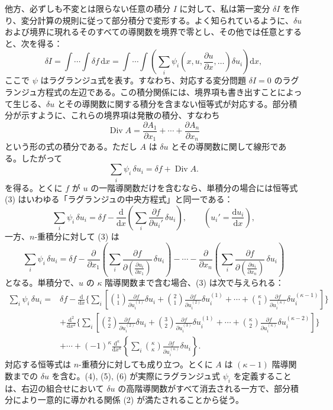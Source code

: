 \documentclass[11pt]{article}
\providecommand{\dd}{\mathrm d}
\providecommand{\Div}{\operatorname{Div}}
\providecommand{\p}{\partial}
\begin{document}
他方、必ずしも不変とは限らない任意の積分 \(I\) に対して、私は第一変分 \(\delta I\) を作り、変分計算の規則に従って部分積分で変形する。よく知られているように、\(\delta u\) および境界に現れるそのすべての導関数を境界で零とし、その他では任意とすると、次を得る：
\begin{equation}
\delta I=\int\!\cdots\!\int \delta f\,\dd x
=\int\!\cdots\!\int\left(\sum_i\psi_i\!\left(x,u,\frac{\p u}{\p x},\ldots\right)\delta u_i\right)\dd x,
\tag{2}
\end{equation}
ここで \(\psi\) はラグランジュ式を表す。すなわち、対応する変分問題 \(\delta I=0\) のラグランジュ方程式の左辺である。この積分関係には、境界項も書き出すことによって生じる、\(\delta u\) とその導関数に関する積分を含まない恒等式が対応する。部分積分が示すように、これらの境界項は発散の積分、すなわち
\[
\Div A=\frac{\p A_1}{\p x_1}+\cdots+\frac{\p A_n}{\p x_n}
\]
という形の式の積分である。ただし \(A\) は \(\delta u\) とその導関数に関して線形である。したがって
\begin{equation}
\sum_i\psi_i\,\delta u_i=\delta f+\Div A.
\tag{3}
\end{equation}
を得る。とくに \(f\) が \(u\) の一階導関数だけを含むなら、単積分の場合には恒等式 (3) はいわゆる「ラグランジュの中央方程式」と同一である：
\begin{equation}
\sum_i \psi_i\,\delta u_i
=\delta f-\frac{\dd}{\dd x}\left(\sum_i\frac{\p f}{\p u_i'}\,\delta u_i\right),
\qquad \left(u_i'=\frac{\dd u_i}{\dd x}\right),
\tag{4}
\end{equation}
一方、\(n\)-重積分に対して (3) は
\begin{equation}
\sum_i\psi_i\,\delta u_i
=
\delta f
-\frac{\p}{\p x_1}\left(\sum_i\frac{\p f}{\p \left(\frac{\p u_i}{\p x_1}\right)}\,\delta u_i\right)
-\cdots
-\frac{\p}{\p x_n}\left(\sum_i\frac{\p f}{\p \left(\frac{\p u_i}{\p x_n}\right)}\,\delta u_i\right)
\tag{5}
\end{equation}
となる。単積分で、\(u\) の \(\kappa\) 階導関数まで含む場合、(3) は次で与えられる：
\begin{equation}
\begin{aligned}
\sum_i\psi_i\,\delta u_i
={}&\delta f
-\frac{\dd}{\dd x}\Bigg\{\sum_i\left[
\binom{1}{1}\frac{\p f}{\p u_i^{(1)}}\delta u_i
+\binom{2}{1}\frac{\p f}{\p u_i^{(2)}}\delta u_i^{(1)}
+\cdots+
\binom{\kappa}{1}\frac{\p f}{\p u_i^{(\kappa)}}\delta u_i^{(\kappa-1)}
\right]\Bigg\}\\
&+\frac{\dd^2}{\dd x^2}\Bigg\{\sum_i\left[
\binom{2}{2}\frac{\p f}{\p u_i^{(2)}}\delta u_i
+\binom{3}{2}\frac{\p f}{\p u_i^{(3)}}\delta u_i^{(1)}
+\cdots+
\binom{\kappa}{2}\frac{\p f}{\p u_i^{(\kappa)}}\delta u_i^{(\kappa-2)}
\right]\Bigg\}\\
&+\cdots
+(-1)^\kappa\frac{\dd^\kappa}{\dd x^\kappa}
\left\{\sum_i\binom{\kappa}{\kappa}
\frac{\p f}{\p u_i^{(\kappa)}}\delta u_i\right\}.
\end{aligned}
\tag{6}
\end{equation}
対応する恒等式は \(n\)-重積分に対しても成り立つ。とくに \(A\) は \((\kappa-1)\) 階導関数までの \(\delta u\) を含む。(4), (5), (6) が実際にラグランジュ式 \(\psi_i\) を定義することは、右辺の組合せにおいて \(\delta u\) の高階導関数がすべて消去される一方で、部分積分により一意的に導かれる関係 (2) が満たされることから従う。
\end{document}
